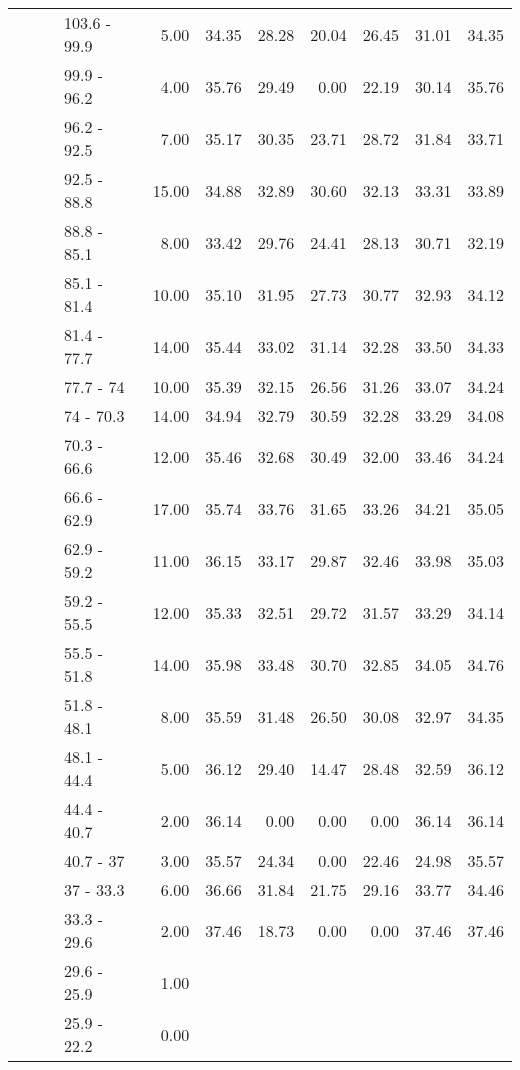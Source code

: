 \begin{longtable}{llllrrrrrrr}
   &  &  & 103.6 - 99.9 & 5.00 & 34.35 & 28.28 & 20.04 & 26.45 & 31.01 & 34.35 \\ 
   &  &  & 99.9 - 96.2 & 4.00 & 35.76 & 29.49 & 0.00 & 22.19 & 30.14 & 35.76 \\ 
   &  &  & 96.2 - 92.5 & 7.00 & 35.17 & 30.35 & 23.71 & 28.72 & 31.84 & 33.71 \\ 
   &  &  & 92.5 - 88.8 & 15.00 & 34.88 & 32.89 & 30.60 & 32.13 & 33.31 & 33.89 \\ 
   &  &  & 88.8 - 85.1 & 8.00 & 33.42 & 29.76 & 24.41 & 28.13 & 30.71 & 32.19 \\ 
   &  &  & 85.1 - 81.4 & 10.00 & 35.10 & 31.95 & 27.73 & 30.77 & 32.93 & 34.12 \\ 
   &  &  & 81.4 - 77.7 & 14.00 & 35.44 & 33.02 & 31.14 & 32.28 & 33.50 & 34.33 \\ 
   &  &  & 77.7 - 74 & 10.00 & 35.39 & 32.15 & 26.56 & 31.26 & 33.07 & 34.24 \\ 
   &  &  & 74 - 70.3 & 14.00 & 34.94 & 32.79 & 30.59 & 32.28 & 33.29 & 34.08 \\ 
   &  &  & 70.3 - 66.6 & 12.00 & 35.46 & 32.68 & 30.49 & 32.00 & 33.46 & 34.24 \\ 
   &  &  & 66.6 - 62.9 & 17.00 & 35.74 & 33.76 & 31.65 & 33.26 & 34.21 & 35.05 \\ 
   &  &  & 62.9 - 59.2 & 11.00 & 36.15 & 33.17 & 29.87 & 32.46 & 33.98 & 35.03 \\ 
   &  &  & 59.2 - 55.5 & 12.00 & 35.33 & 32.51 & 29.72 & 31.57 & 33.29 & 34.14 \\ 
   &  &  & 55.5 - 51.8 & 14.00 & 35.98 & 33.48 & 30.70 & 32.85 & 34.05 & 34.76 \\ 
   &  &  & 51.8 - 48.1 & 8.00 & 35.59 & 31.48 & 26.50 & 30.08 & 32.97 & 34.35 \\ 
   &  &  & 48.1 - 44.4 & 5.00 & 36.12 & 29.40 & 14.47 & 28.48 & 32.59 & 36.12 \\ 
   &  &  & 44.4 - 40.7 & 2.00 & 36.14 & 0.00 & 0.00 & 0.00 & 36.14 & 36.14 \\ 
   &  &  & 40.7 - 37 & 3.00 & 35.57 & 24.34 & 0.00 & 22.46 & 24.98 & 35.57 \\ 
   &  &  & 37 - 33.3 & 6.00 & 36.66 & 31.84 & 21.75 & 29.16 & 33.77 & 34.46 \\ 
   &  &  & 33.3 - 29.6 & 2.00 & 37.46 & 18.73 & 0.00 & 0.00 & 37.46 & 37.46 \\ 
   &  &  & 29.6 - 25.9 & 1.00 &  &  &  &  &  &  \\ 
   &  &  & 25.9 - 22.2 & 0.00 &  &  &  &  &  &  \\ 

\end{longtable}
